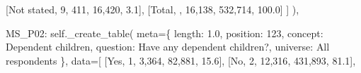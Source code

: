 \documentclass[
  11pt,
  a4paper,
]{article}
\newenvironment{Shaded}{\begin{snugshade}}{\end{snugshade}}
\newcommand{\NormalTok}[1]{\textcolor[rgb]{0.00,0.23,0.31}{#1}}
\newcommand{\OperatorTok}[1]{\textcolor[rgb]{0.37,0.37,0.37}{#1}}
\newcommand{\StringTok}[1]{\textcolor[rgb]{0.13,0.47,0.30}{#1}}
\newcommand{\VariableTok}[1]{\textcolor[rgb]{0.07,0.07,0.07}{#1}}
\begin{document}
\begin{Shaded}
\begin{Highlighting}[]
\NormalTok{                    [}\StringTok{\textquotesingle{}Not stated\textquotesingle{}}\NormalTok{, }\StringTok{\textquotesingle{}9\textquotesingle{}}\NormalTok{, }\StringTok{\textquotesingle{}411\textquotesingle{}}\NormalTok{, }\StringTok{\textquotesingle{}16,420\textquotesingle{}}\NormalTok{, }\StringTok{\textquotesingle{}3.1\textquotesingle{}}\NormalTok{],}
\NormalTok{                    [}\StringTok{\textquotesingle{}Total\textquotesingle{}}\NormalTok{, }\StringTok{\textquotesingle{}\textquotesingle{}}\NormalTok{, }\StringTok{\textquotesingle{}16,138\textquotesingle{}}\NormalTok{, }\StringTok{\textquotesingle{}532,714\textquotesingle{}}\NormalTok{, }\StringTok{\textquotesingle{}100.0\textquotesingle{}}\NormalTok{]}
\NormalTok{                ]}
\NormalTok{            ),}
            
            \StringTok{\textquotesingle{}MS\_P02\textquotesingle{}}\NormalTok{: }\VariableTok{self}\NormalTok{.\_create\_table(}
\NormalTok{                meta}\OperatorTok{=}\NormalTok{\{}
                    \StringTok{\textquotesingle{}length\textquotesingle{}}\NormalTok{: }\StringTok{\textquotesingle{}1.0\textquotesingle{}}\NormalTok{, }\StringTok{\textquotesingle{}position\textquotesingle{}}\NormalTok{: }\StringTok{\textquotesingle{}123\textquotesingle{}}\NormalTok{,}
                    \StringTok{\textquotesingle{}concept\textquotesingle{}}\NormalTok{: }\StringTok{\textquotesingle{}Dependent children\textquotesingle{}}\NormalTok{,}
                    \StringTok{\textquotesingle{}question\textquotesingle{}}\NormalTok{: }\StringTok{\textquotesingle{}Have any dependent children?\textquotesingle{}}\NormalTok{,}
                    \StringTok{\textquotesingle{}universe\textquotesingle{}}\NormalTok{: }\StringTok{\textquotesingle{}All respondents\textquotesingle{}}
\NormalTok{                \},}
\NormalTok{                data}\OperatorTok{=}\NormalTok{[}
\NormalTok{                    [}\StringTok{\textquotesingle{}Yes\textquotesingle{}}\NormalTok{, }\StringTok{\textquotesingle{}1\textquotesingle{}}\NormalTok{, }\StringTok{\textquotesingle{}3,364\textquotesingle{}}\NormalTok{, }\StringTok{\textquotesingle{}82,881\textquotesingle{}}\NormalTok{, }\StringTok{\textquotesingle{}15.6\textquotesingle{}}\NormalTok{],}
\NormalTok{                    [}\StringTok{\textquotesingle{}No\textquotesingle{}}\NormalTok{, }\StringTok{\textquotesingle{}2\textquotesingle{}}\NormalTok{, }\StringTok{\textquotesingle{}12,316\textquotesingle{}}\NormalTok{, }\StringTok{\textquotesingle{}431,893\textquotesingle{}}\NormalTok{, }\StringTok{\textquotesingle{}81.1\textquotesingle{}}\NormalTok{],}

\end{Highlighting}
\end{Shaded}
\end{document}
